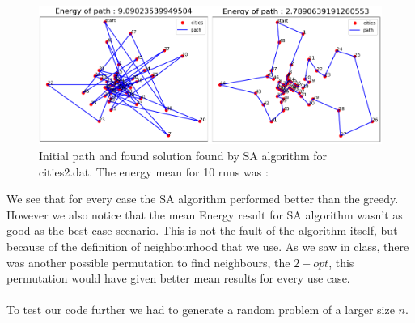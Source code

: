 \documentclass[a4paper]{article}
\begin{document}
\begin{figure}[H]
\center
\includegraphics[width=1\textwidth]{images/algorithm_sa_cities2.PNG}
\caption{Initial path and found solution found by SA algorithm for cities2.dat. The energy mean for 10 runs was :}
\end{figure}

We see that for every case the SA algorithm performed better than the greedy. However we also notice that the mean Energy result for SA algorithm wasn't as good as the best case scenario. This is not the fault of the algorithm itself, but because of the definition of neighbourhood that we use. As we saw in class, there was another possible permutation to find neighbours, the $2-opt$, this permutation would have given better mean results for every use case.\\\\
To test our code further we had to generate a random problem of a larger size $n$.
\end{document}
